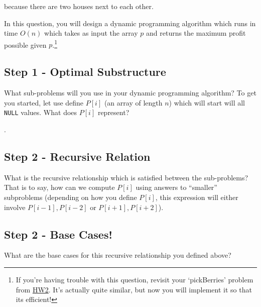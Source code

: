 \documentclass [12pt]{article}
\begin{document}
\begin{center} 
\end{center} because there are two houses next to each other. 

In this question, you will design a dynamic programming algorithm which runs in time $O(n)$ which takes as input the array $p$ and returns the maximum profit possible given $p$.\footnote{If you're having trouble with this question, revisit your `pickBerries' problem from \href{https://replit.com/@COMP285/HW2-Code}{HW2}. It's actually quite similar, but now you will implement it so that its efficient!}


\subsection{Step 1 - Optimal Substructure } 
What sub-problems will you use in your dynamic programming algorithm? To get you started, let use define $P[i]$ (an array of length $n$) which will start will all \texttt{NULL} values. What does $P[i]$ represent?

.

\subsection{Step 2 - Recursive Relation }
What is the recursive relationship which is satisfied between the sub-problems? That is to say, how can we compute $P[i]$ using answers to ``smaller'' subproblems (depending on how you define $P[i]$, this expression will either involve $P[i-1], P[i-2]$ or $P[i+1], P[i+2]$).


\subsection{Step 2 - Base Cases! }
What are the base cases for this recursive relationship you defined above?
\end{document}
